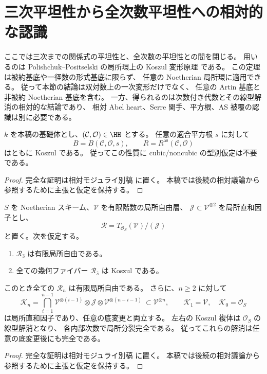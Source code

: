 \section{三次平坦性から全次数平坦性への相対的な認識}
\label{sec:relative-koszul}

ここでは三次までの関係式の平坦性と、全次数の平坦性との間を閉じる。
用いるのは Polishchuk--Positselski の局所環上の Koszul 変形原理
\cite[Chapter 6, Theorem 7.3]{PolishchukPositselski2005} である。
この定理は被約基底や一径数の形式基底に限らず、
任意の Noetherian 局所環に適用できる。
従って本節の結論は双対数上の一次変形だけでなく、
任意の Artin 基底と非被約 Noetherian 基底を含む。
一方、得られるのは次数付き代数とその線型解消の相対的な結論であり、
相対 Abel heart、Serre 関手、平方根、AS 被覆の認識は別に必要である。

\begin{proposition}
\label{prop:all-h2-antiserre-koszul}
$k$ を本稿の基礎体とし、$(\mathcal C,\mathcal O)\in\HH$ とする。
任意の適合平方根 $s$ に対して
\[
 B=B(\mathcal C,\mathcal O,s),\qquad
 R=R^{\mathrm{as}}(\mathcal C,\mathcal O)
\]
はともに Koszul である。
従ってこの性質に cubic/noncubic の型別仮定は不要である。
\end{proposition}
\begin{proof}
完全な証明は相対モジュライ別稿
\cite[相対Koszul・Noetherian基底変更・tailsの節]{QuadricModuli2026} に置く。
本稿では後続の相対議論から参照するために主張と仮定を保持する。
\end{proof}

\begin{lemma}
\label{lem:relative-koszul-degree-three}
$S$ を Noetherian スキーム、$\mathcal V$ を有限階数の局所自由層、
$\mathcal J\subset\mathcal V^{\otimes2}$ を局所直和因子とし、
\[
 \mathcal R=T_{\mathcal O_S}(\mathcal V)/(\mathcal J)
\]
と置く。次を仮定する。
\begin{enumerate}
\item $\mathcal R_3$ は有限局所自由である。
\item 全ての幾何ファイバー $\mathcal R_{\bar s}$ は Koszul である。
\end{enumerate}
このとき全ての $\mathcal R_n$ は有限局所自由である。
さらに、$n\ge2$ に対して
\[
 \mathcal K_n=
 \bigcap_{i=1}^{n-1}
 \mathcal V^{\otimes(i-1)}\otimes\mathcal J
       \otimes\mathcal V^{\otimes(n-i-1)}
 \ \subset\mathcal V^{\otimes n},
 \qquad
 \mathcal K_1=\mathcal V,\quad \mathcal K_0=\mathcal O_S
\]
は局所直和因子であり、任意の底変更と両立する。
左右の Koszul 複体は $\mathcal O_S$ の線型解消となり、
各内部次数で局所分裂完全である。
従ってこれらの解消は任意の底変更後にも完全である。
\end{lemma}
\begin{proof}
完全な証明は相対モジュライ別稿
\cite[相対Koszul・Noetherian基底変更・tailsの節]{QuadricModuli2026} に置く。
本稿では後続の相対議論から参照するために主張と仮定を保持する。
\end{proof}


